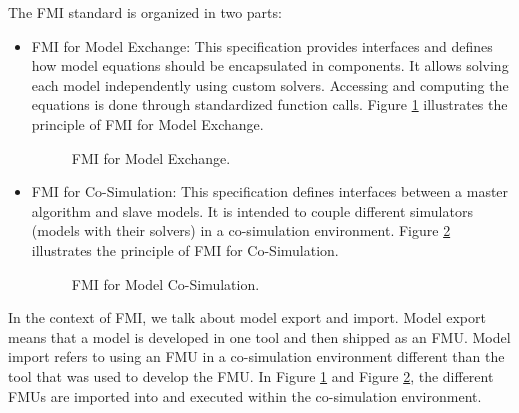 The FMI standard is organized in two parts:
\begin{itemize}
\item FMI for Model Exchange:
This specification provides interfaces and defines how model equations should be encapsulated in components. It allows solving each model independently using custom solvers. Accessing and computing the equations is done through standardized function calls. Figure \ref{fig:fmimdlexg} illustrates the principle of FMI for Model Exchange.

\begin{figure}[phbt]
\centering

\caption{FMI for Model Exchange.}
\label{fig:fmimdlexg}
\end{figure}

\item FMI for Co-Simulation:
This specification defines interfaces between a master algorithm and slave models. It is intended to couple different simulators (models with their solvers) in a co-simulation environment. Figure \ref{fig:fmicosim} illustrates the principle of FMI for Co-Simulation.

\begin{figure}[phbt]
\centering

\caption{FMI for Model Co-Simulation.}
\label{fig:fmicosim}
\end{figure} 
\end{itemize}

In the context of FMI, we talk about model export and import. Model export means that a model is developed in one tool and then shipped as an FMU. Model import refers to using an FMU in a co-simulation environment different than the tool that was used to develop the FMU. In Figure \ref{fig:fmimdlexg} and Figure \ref{fig:fmicosim}, the different FMUs are imported into and executed within the co-simulation environment.



 


